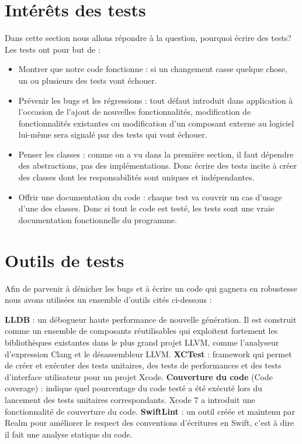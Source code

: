 \section{Intérêts des tests} %
\label{sub:pourquoi_tester_}
Dans cette section nous allons répondre à la question, pourquoi écrire des tests?\newline
Les tests ont pour but de :
\begin{itemize}
	\item Montrer que notre code fonctionne :  si un changement casse quelque chose, un ou plusieurs des tests vont échouer.
	\item Prévenir les bugs et les régressions : tout défaut introduit dans application à l'occasion de l'ajout de nouvelles fonctionnalités, modification de fonctionnalités existantes ou modification d'un composant externe au logiciel lui-même sera signalé par des tests qui vont échouer.
	\item Penser les classes : comme on a vu dans la première section, il faut dépendre des abstractions, pas des implémentations. Donc écrire des tests incite à créer des classes dont les responsabilités sont uniques et indépendantes.
	\item Offrir une documentation du code : chaque test va couvrir un cas d'usage d'une des classes. Donc si tout le code est testé, les tests sont une vraie documentation fonctionnelle du programme.
\end{itemize} 

\section{Outils de tests} %
\label{sub:outils_de_tests}
Afin de parvenir à dénicher les bugs et à écrire un code qui gagnera en robustesse nous avons utilisées un ensemble d'outils cités ci-dessous : 
\begin{itemize}
	\itemb \textbf{LLDB} : un débogueur haute performance de nouvelle génération. Il est construit comme un ensemble de composants réutilisables qui exploitent fortement les bibliothèques existantes dans le plus grand projet LLVM, comme l'analyseur d'expression Clang et le désassembleur LLVM.
	\itemb \textbf{XCTest} : framework qui permet de créer et exécuter des tests unitaires, des tests de performances et des tests d'interface utilisateur pour un projet Xcode.
	\itemb \textbf{Couverture du code} (Code coverage) : indique quel pourcentage du code testé a été exécuté lors du lancement des tests unitaires correspondants. Xcode 7 a introduit une fonctionnalité de couverture du code.
	\itemb \textbf{SwiftLint} : un outil créée et maintenu par Realm pour améliorer le respect des conventions d’écritures en Swift, c'est à dire il fait une analyse statique du code.
\end{itemize}

